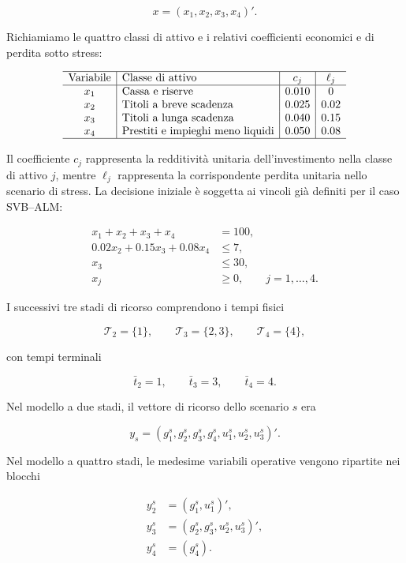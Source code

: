 \[
x=(x_1,x_2,x_3,x_4)'.
\]

Richiamiamo le quattro classi di attivo e i relativi
coefficienti economici e di perdita sotto stress:

\[
\begin{array}{c|l|c|c}
\hline
\text{Variabile} & \text{Classe di attivo}
& c_j & \ell_j\\
\hline
x_1 & \text{Cassa e riserve}                  & 0.010 & 0\\
x_2 & \text{Titoli a breve scadenza}          & 0.025 & 0.02\\
x_3 & \text{Titoli a lunga scadenza}          & 0.040 & 0.15\\
x_4 & \text{Prestiti e impieghi meno liquidi} & 0.050 & 0.08\\
\hline
\end{array}
\]

Il coefficiente $c_j$ rappresenta la redditivit\`a
unitaria dell'investimento nella classe di attivo $j$,
mentre $\ell_j$ rappresenta la corrispondente perdita
unitaria nello scenario di stress. La decisione iniziale \`e soggetta
ai vincoli gi\`a definiti per il caso SVB--ALM:

\[
\begin{aligned}
x_1+x_2+x_3+x_4&=100,\\
0.02x_2+0.15x_3+0.08x_4&\leq7,\\
x_3&\leq30,\\
x_j&\geq0,\qquad j=1,\ldots,4.
\end{aligned}
\]

I successivi tre stadi di ricorso
comprendono i tempi fisici

\[
\mathcal T_2=\{1\},
\qquad
\mathcal T_3=\{2,3\},
\qquad
\mathcal T_4=\{4\},
\]

\noindent con tempi terminali

\[
\bar t_2=1,
\qquad
\bar t_3=3,
\qquad
\bar t_4=4.
\]

Nel modello a due stadi, il vettore
di ricorso dello scenario $s$ era

\[
y_s=
(g_1^s,g_2^s,g_3^s,g_4^s,
u_1^s,u_2^s,u_3^s)'.
\]

Nel modello a quattro stadi,
le medesime variabili operative
vengono ripartite nei blocchi

\[
\begin{aligned}
y_2^s
&=
(g_1^s,u_1^s)',
\\[4pt]
y_3^s
&=
(g_2^s,g_3^s,u_2^s,u_3^s)',
\\[4pt]
y_4^s
&=
(g_4^s).
\end{aligned}
\]

